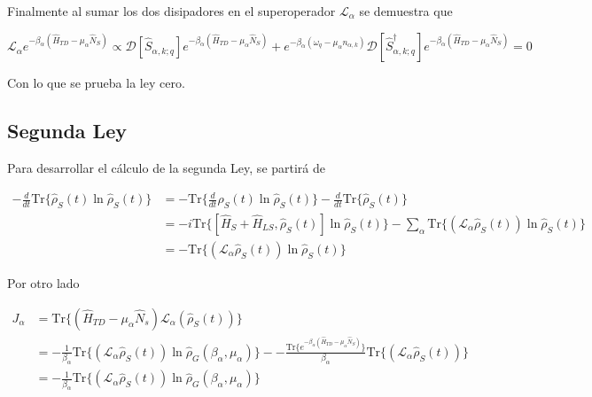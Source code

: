 \begin{appendixs}
Finalmente al sumar los dos disipadores en el superoperador $\mathcal{L}_{\alpha}$ se demuestra que

\begin{equation*}
    \mathcal{L}_{\alpha}e^{-\beta_{\alpha}(\hat{H}_{TD} - \mu_{\alpha}\hat{N}_{S})} \propto  \mathcal{D}[\hat{S}_{\alpha,k;q}]e^{-\beta_{\alpha}(\hat{H}_{TD} - \mu_{\alpha}\hat{N}_{S})} + e^{-\beta_{\alpha}(\omega_{q} - \mu_{\alpha}n_{\alpha,k})}\mathcal{D}[\hat{S}^{\dagger}_{\alpha,k;q}]e^{-\beta_{\alpha}(\hat{H}_{TD} - \mu_{\alpha}\hat{N}_{S})} = 0
\end{equation*}

Con lo que se prueba la ley cero.

\newpage


\subsection{Segunda Ley}
Para desarrollar el cálculo de la segunda Ley, se partirá de

\begin{align*}
    - \frac{d}{dt}\text{Tr}\{ \hat{\rho}_{S}(t)\ln \hat{\rho}_{S}(t) \} & =  -\text{Tr}\Big\{ \frac{d}{dt}\hat{\rho}_{S}(t)\ln \hat{\rho}_{S}(t) \Big\} - \frac{d}{dt}\text{Tr}\{\hat{\rho}_{S}(t) \}\\
  & = - i \text{Tr}\{[\hat{H}_{S}+\hat{H}_{LS},\hat{\rho}_{S}(t)]\ln \hat{\rho}_{S}(t)  \} - \sum_{\alpha} \text{Tr}\{(\mathcal{L}_{\alpha}\hat{\rho}_{S}(t)) \ln \hat{\rho}_{S}(t) \}  \\
  & = -\text{Tr}\{(\mathcal{L}_{\alpha}\hat{\rho}_{S}(t)) \ln \hat{\rho}_{S}(t) \}
\end{align*}

Por otro lado

\begin{align*}
    J_{\alpha} & = \text{Tr}\{ (\hat{H}_{TD} - \mu_{\alpha}\hat{N}_{s})\mathcal{L}_{\alpha}(\hat{\rho}_{S}(t)) \} \\
    & = -\frac{1}{\beta_{\alpha}} \text{Tr}\{(\mathcal{L}_{\alpha}\hat{\rho}_{S}(t)) \ln \hat{\rho}_{G}(\beta_{\alpha},\mu_{\alpha})  \} - -\frac{\text{Tr}\{e^{-\beta_{\alpha}(\hat{H}_{TD} - \mu_{\alpha}\hat{N}_{S})} \} }{\beta_{\alpha}} \text{Tr}\{(\mathcal{L}_{\alpha}\hat{\rho}_{S}(t)) \} \\
    & = -\frac{1}{\beta_{\alpha}} \text{Tr}\{(\mathcal{L}_{\alpha}\hat{\rho}_{S}(t))\ln \hat{\rho}_{G}(\beta_{\alpha},\mu_{\alpha})  \}
\end{align*}


\end{appendixs}
